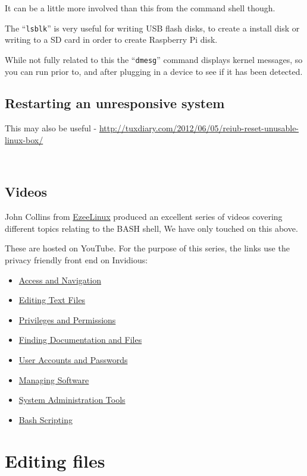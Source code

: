 \documentclass{extbook}
\newcommand\youtube[2]{\href{https://invidious.snopyta.org/watch?v=#1}{#2}}
\begin{document}
It can be a little more involved than this from the command shell though.

The ``\verb|lsblk|'' is very useful for writing USB flash disks, to create a install disk or writing to a SD card in order to create Raspberry Pi disk.

While not fully related to this the ``\verb|dmesg|'' command displays kernel messages, so you can run prior to, and after plugging in a device to see if it has been detected.

\subsection{Restarting an unresponsive system}

This may also be useful - \url{http://tuxdiary.com/2012/06/05/reiub-reset-unusable-linux-box/}

\



\subsection{Videos}

John Collins from \href{https://www.ezeelinux.com/}{EzeeLinux} produced an excellent series of videos covering different topics relating to the BASH shell, We have only touched on this above.

These are hosted on YouTube. For the purpose of this series, the links use the privacy friendly front end on Invidious:

\begin{itemize}
\item \youtube{eH8Z9zeywq0}{Access and Navigation}
\item \youtube{eH8Z9zeywq0}{Editing Text Files}
\item \youtube{s23NqWKxOXk}{Privileges and Permissions}
\item \youtube{4r7V2-EBnR0}{Finding Documentation and Files}
\item \youtube{XVCf0cou6EU}{User Accounts and Passwords}
\item \youtube{lNyJllHk2SA}{Managing Software}
\item \youtube{4\_21KZ3qKEI7}{System Administration Tools}
\item \youtube{57sp8Y0GL40}{Bash Scripting}
\end{itemize}


\section{Editing files}
\end{document}
